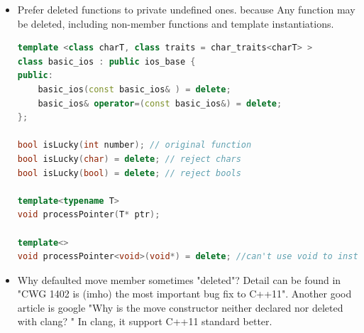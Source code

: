 \documentclass[a4paper,11pt,twoside]{book}
\begin{document}
\begin{itemize}
    \item Prefer deleted functions to private undefined ones. because Any function may be deleted, including non-member functions and template instantiations.

\begin{lstlisting}[frame=single, language=c++]
template <class charT, class traits = char_traits<charT> >
class basic_ios : public ios_base {
public:
	basic_ios(const basic_ios& ) = delete;
	basic_ios& operator=(const basic_ios&) = delete;
};

bool isLucky(int number); // original function
bool isLucky(char) = delete; // reject chars
bool isLucky(bool) = delete; // reject bools

template<typename T>
void processPointer(T* ptr);

template<>
void processPointer<void>(void*) = delete; //can't use void to instantiate.
\end{lstlisting} 

    \item Why defaulted move member sometimes "deleted"? Detail can be found in "CWG 1402 is (imho) the most important bug fix to C++11". Another good article is google "Why is the move constructor neither declared nor deleted with clang? " In clang, it support C++11 standard better. 

\end{itemize}
\end{document}
